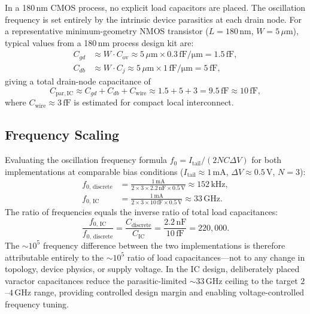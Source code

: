 \documentclass[11pt]{article}
\begin{document}
In a 180\,nm CMOS process, no explicit load capacitors are placed. The
oscillation frequency is set entirely by the intrinsic device parasitics at
each drain node. For a representative minimum-geometry NMOS transistor
($L = 180\,\mathrm{nm}$, $W = 5\,\mu\mathrm{m}$), typical values from a
180\,nm process design kit are:
%
\begin{align}
    C_{gd} &\approx W \cdot C_{\mathrm{ov}} \approx 5\,\mu\mathrm{m}
        \times 0.3\,\mathrm{fF/\mu m} = 1.5\,\mathrm{fF}, \\
    C_{db} &\approx W \cdot C_j \approx 5\,\mu\mathrm{m}
        \times 1\,\mathrm{fF/\mu m} = 5\,\mathrm{fF},
\end{align}
%
giving a total drain-node capacitance of
%
\begin{equation}
    C_{\mathrm{par,IC}} \approx C_{gd} + C_{db} + C_{\mathrm{wire}}
    \approx 1.5 + 5 + 3 = 9.5\,\mathrm{fF} \approx 10\,\mathrm{fF},
\end{equation}
%
where $C_{\mathrm{wire}} \approx 3\,\mathrm{fF}$ is estimated for compact
local interconnect.
 
\subsection{Frequency Scaling}
 
Evaluating the oscillation frequency formula $f_0 = I_{\mathrm{tail}}/(2NC\Delta V)$
for both implementations at comparable bias conditions
($I_{\mathrm{tail}} \approx 1\,\mathrm{mA}$, $\Delta V \approx 0.5\,\mathrm{V}$,
$N = 3$):
%
\begin{align}
    f_{0,\,\mathrm{discrete}} &= \frac{1\,\mathrm{mA}}
        {2 \times 3 \times 2.2\,\mathrm{nF} \times 0.5\,\mathrm{V}}
        \approx 152\,\mathrm{kHz}, \\[4pt]
    f_{0,\,\mathrm{IC}} &= \frac{1\,\mathrm{mA}}
        {2 \times 3 \times 10\,\mathrm{fF} \times 0.5\,\mathrm{V}}
        \approx 33\,\mathrm{GHz}.
\end{align}
%
The ratio of frequencies equals the inverse ratio of total load capacitances:
%
\begin{equation}
    \frac{f_{0,\,\mathrm{IC}}}{f_{0,\,\mathrm{discrete}}}
    = \frac{C_{\mathrm{discrete}}}{C_{\mathrm{IC}}}
    = \frac{2.2\,\mathrm{nF}}{10\,\mathrm{fF}} = 220{,}000.
\end{equation}
%
The $\sim\!10^5$ frequency difference between the two implementations is
therefore attributable entirely to the $\sim\!10^5$ ratio of load
capacitances---not to any change in topology, device physics, or supply voltage.
In the IC design, deliberately placed varactor capacitances reduce the
parasitic-limited $\sim\!33\,\mathrm{GHz}$ ceiling to the target $2$--$4\,\mathrm{GHz}$
range, providing controlled design margin and enabling voltage-controlled
frequency tuning.
 
\end{document}
